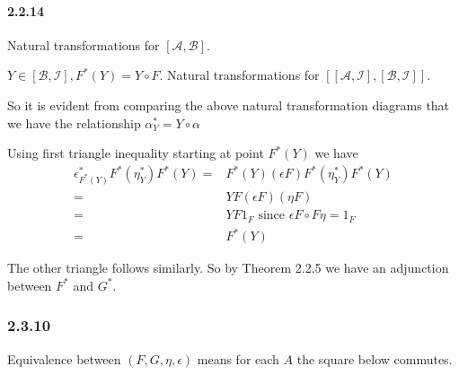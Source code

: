 \documentclass{article}
\begin{document}
\paragraph {2.2.14 }

Natural transformations for $[\mathcal{A}, \mathcal{B}]$.

\begin{center}
\end{center}

$Y \in [\mathcal{B},\mathcal{I}], F^*(Y) = Y \circ F$. Natural transformations for $[[\mathcal{A},\mathcal{I}], [\mathcal{B},\mathcal{I}]]$.

\begin{center}
\end{center}

So it is evident from comparing the above natural transformation diagrams that we have the relationship $\alpha^*_Y = Y \circ \alpha$

Using first triangle inequality starting at point $F^*(Y)$ we have
\begin{align*}
  \epsilon^*_{F^*(Y)}F^*(\eta_Y^*)F^*(Y) = & F^*(Y) (\epsilon F) F^*(\eta_Y^*)F^*(Y) \\
  = & Y F(\epsilon F)(\eta F) \\
  = & YF1_F \text{ since } \epsilon F \circ F \eta = 1_F\\
  = & F^*(Y)
\end{align*}

The other triangle follows similarly. So by Theorem 2.2.5 we have an adjunction between $F^*$ and $G^*$.

\subsubsection*{2.3.10}

Equivalence between $(F, G, \eta, \epsilon)$ means for each $A$ the square below commutes.
\end{document}
